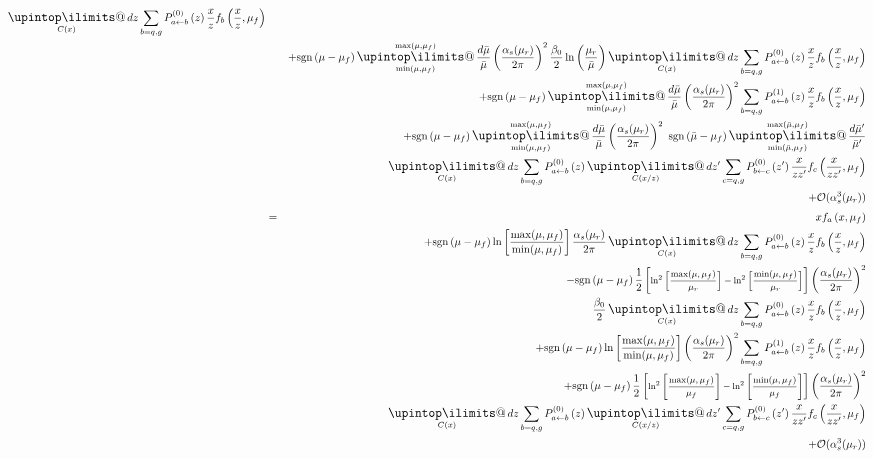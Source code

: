 \documentclass[a4paper,11pt]{article}
\makeatletter
\newcommand{\mksmall}[1]{\textnormal{\smaller$#1$}}
\newcommand{\sgn}[2]{\mathrm{sgn}\left(#1-#2\right)}
\newcommand{\xfhathat}[3]{#2 \widehat{\widehat{f}}_{#1}\left(#2, #3\right)}
\newcommand{\xfhat}[3]{#2 \widehat{f}_{#1}\left(#2, #3\right)}
\newcommand{\xf}[3]{#2 f_{#1}\left(#2, #3\right)}
\newcommand{\lodglapkernel}[3]{P_{#1\leftarrow #2}^{(0)}\left(#3\right)}
\newcommand{\nlodglapkernel}[3]{P_{#1\leftarrow #2}^{(1)}\left(#3\right)}
\newcommand{\upint}{\DOTSI\upintop\ilimits@}
\renewcommand{\int}{\mathop{\mathlarger{\upint}}}
\makeatother
\begin{document}
\begin{eqnarray*}
\int\displaylimits_{C(x)}  dz
\sum\limits_{b=q,g} \lodglapkernel{a}{b}{z}  \xf{b}{\frac{x}{z}}{\mu_f}
\\&&
+
\sgn{\mu}{\mu_f}
\int\displaylimits_{\min(\mu,\mu_f) }^{\max(\mu,\mu_f)}\frac{d\bar\mu}{\bar\mu} \left(\frac{\alpha_s(\mu_r)}{2\pi}\right)^2\frac{\beta_0}{2}\ln\left(\frac{\mu_r}{\bar\mu}\right)
\int\displaylimits_{C(x)}  dz
\sum\limits_{b=q,g} \lodglapkernel{a}{b}{z}  \xf{b}{\frac{x}{z}}{\mu_f}
\\&&
+
\sgn{\mu}{\mu_f}
\int\displaylimits_{\min(\mu,\mu_f) }^{\max(\mu,\mu_f)}\frac{d\bar\mu}{\bar\mu} \left(\frac{\alpha_s(\mu_r)}{2\pi}\right)^2
\sum\limits_{b=q,g} \nlodglapkernel{a}{b}{z}  \xf{b}{\frac{x}{z}}{\mu_f}
\\&&
+
\sgn{\mu}{\mu_f}
\int\displaylimits_{\min(\mu,\mu_f) }^{\max(\mu,\mu_f)}\frac{d\bar\mu}{\bar\mu} \left(\frac{\alpha_s(\mu_r)}{2\pi}\right)^2
~\sgn{\bar\mu}{\mu_f}
\int\displaylimits_{\min(\bar\mu,\mu_f) }^{\max(\bar\mu,\mu_f)}\frac{d\bar\mu'}{\bar\mu'}
\\&&
\qquad\qquad\qquad\quad
\int\displaylimits_{C(x)}  dz 
\sum\limits_{b=q,g}  \lodglapkernel{a}{b}{z} 
\int\displaylimits_{C(x/z)}  dz'
 \sum\limits_{c=q,g} \lodglapkernel{b}{c}{z'}  \xf{c}{\frac{x}{zz'}}{\mu_f}
\\&&
+
\mathcal{O}(\alpha_s^3(\mu_r))
%
%
%
%
%
%
\\&=&
\xf{a}{x}{\mu_f}
\\&&
+
\sgn{\mu}{\mu_f} \ln\left[\frac{\max(\mu,\mu_f)}{\min(\mu,\mu_f)}\right]\frac{\alpha_s(\mu_r)}{2\pi}
\int\displaylimits_{C(x)}  dz
\sum\limits_{b=q,g} \lodglapkernel{a}{b}{z}  \xf{b}{\frac{x}{z}}{\mu_f}
\\&&
-
\sgn{\mu}{\mu_f}
\frac{1}{2}
\left[
\mksmall{\ln^2\left[\frac{\max(\mu,\mu_f)}{\mu_r}\right] - \ln^2\left[\frac{\min(\mu,\mu_f)}{\mu_r}\right]}
\right]
\left(\frac{\alpha_s(\mu_r)}{2\pi}\right)^2
\\&&
\qquad\qquad\qquad\quad
\frac{\beta_0}{2}
\int\displaylimits_{C(x)}  dz
\sum\limits_{b=q,g} \lodglapkernel{a}{b}{z}  \xf{b}{\frac{x}{z}}{\mu_f}
\\&&
+
\sgn{\mu}{\mu_f}
\ln\left[\frac{\max(\mu,\mu_f)}{\min(\mu,\mu_f)}\right] \left(\frac{\alpha_s(\mu_r)}{2\pi}\right)^2
\sum\limits_{b=q,g} \nlodglapkernel{a}{b}{z}  \xf{b}{\frac{x}{z}}{\mu_f}
\\&&
+
\sgn{\mu}{\mu_f}
\frac{1}{2}
\left[
\mksmall{\ln^2\left[\frac{\max(\mu,\mu_f)}{\mu_f}\right] - \ln^2\left[\frac{\min(\mu,\mu_f)}{\mu_f}\right]}
\right] \left(\frac{\alpha_s(\mu_r)}{2\pi}\right)^2
\\&&
\qquad\qquad\qquad\quad
\int\displaylimits_{C(x)}  dz 
\sum\limits_{b=q,g}  \lodglapkernel{a}{b}{z} 
\int\displaylimits_{C(x/z)}  dz'
 \sum\limits_{c=q,g} \lodglapkernel{b}{c}{z'}  \xf{c}{\frac{x}{zz'}}{\mu_f}
\\&&
+
\mathcal{O}(\alpha_s^3(\mu_r))
\end{eqnarray*}
\end{document}
